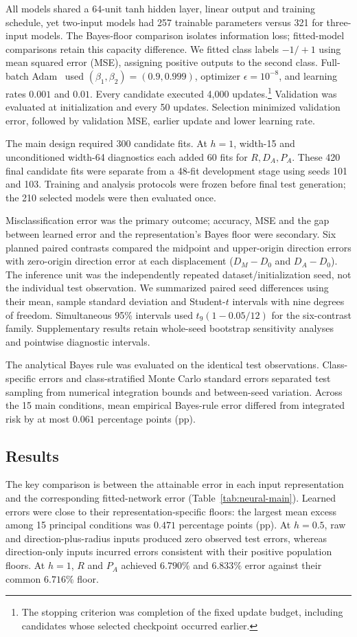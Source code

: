 {All models shared a 64-unit tanh hidden layer, linear output and training schedule, yet two-input models had 257 trainable parameters versus 321 for three-input models. The Bayes-floor comparison isolates information loss; fitted-model comparisons retain this capacity difference. We fitted class labels $-1/+1$ using mean squared error (MSE), assigning positive outputs to the second class. Full-batch Adam~\citep{Kingma2015} used $(\beta_1,\beta_2)=(0.9,0.999)$, optimizer $\epsilon=10^{-8}$, and learning rates $0.001$ and $0.01$. Every candidate executed\vadjust{\nobreak} 4,000 updates.\footnote{The stopping criterion was completion of the fixed update budget, including candidates whose selected checkpoint occurred earlier.} Validation was evaluated at initialization and every 50 updates. Selection minimized validation error, followed by validation MSE, earlier update and lower learning rate.

The main design required 300 candidate fits. At $h=1$, width-15 and unconditioned width-64 diagnostics each added 60 fits for $R,D_A,P_A$. These 420 final candidate fits were separate from a 48-fit development stage using seeds 101 and 103. Training and analysis protocols were frozen before final test generation; the 210 selected models were then evaluated once. 

Misclassification error was the primary outcome; accuracy, MSE and the gap between learned error and the representation's Bayes floor were secondary. Six planned paired contrasts compared the midpoint and upper-origin direction errors with zero-origin direction error at each displacement ($D_M-D_0$ and $D_A-D_0$). The inference unit was the independently repeated dataset/initialization seed, not the individual test observation. We summarized paired seed differences using their mean, sample standard deviation and Student-$t$ intervals with nine degrees of freedom. Simultaneous 95\% intervals used $t_9(1-0.05/12)$ for the six-contrast family. Supplementary results retain whole-seed bootstrap sensitivity analyses and pointwise diagnostic intervals.

The analytical Bayes rule was evaluated on the identical test observations. Class-specific errors and class-stratified Monte Carlo standard errors separated test sampling from numerical integration bounds and between-seed variation. Across the 15 main conditions, mean empirical Bayes-rule error differed from integrated risk by at most $0.061$ percentage points (pp).

\subsection{Results}
The key comparison is between the attainable error in each input representation and the corresponding fitted-network error (Table~\ref{tab:neural-main}). Learned errors were close to their representation-specific floors: the largest mean excess among 15 principal conditions was $0.471$ percentage points (pp). At $h=0.5$, raw and direction-plus-radius inputs produced zero observed test errors, whereas direction-only inputs incurred errors consistent with their positive population floors. At $h=1$, $R$ and $P_A$ achieved $6.790\%$ and $6.833\%$ error against their common $6.716\%$ floor.

}
